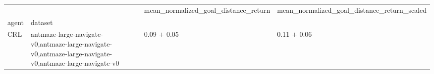 \begin{tabular}{llll}
\toprule
 &  & mean_normalized_goal_distance_return & mean_normalized_goal_distance_return_scaled \\
agent & dataset &  &  \\
\midrule
CRL & antmaze-large-navigate-v0,antmaze-large-navigate-v0,antmaze-large-navigate-v0,antmaze-large-navigate-v0 & 0.09 $\pm$ 0.05 & 0.11 $\pm$ 0.06 \\
\cline{1-4}
\bottomrule
\end{tabular}
